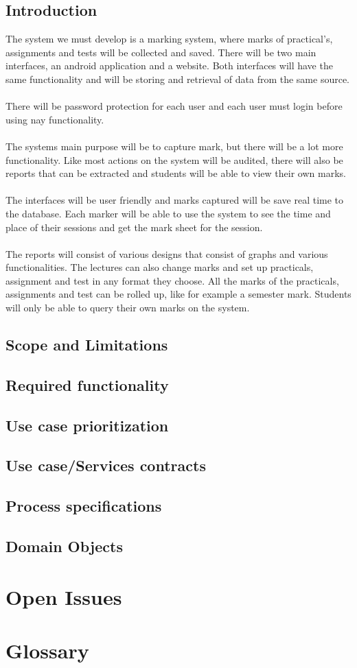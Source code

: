 \documentclass[10pt,a4paper]{article}
\begin{document}
\subsection{Introduction}
The system we must develop is a marking system, where marks of practical’s, assignments and tests will be collected and saved. There will be two main interfaces, an android application and a website. Both interfaces will have the same functionality and will be storing and retrieval of data from the same source.\\\\
There will be password protection for each user and each user must login before using nay functionality.\\\\
The systems main purpose will be to capture mark, but there will be a lot more functionality. Like most actions on the system will be audited, there will also be reports that can be extracted and students will be able to view their own marks.\\\\
The interfaces will be user friendly and marks captured will be save real time to the database. Each marker will be able to use the system to see the time and place of their sessions and get the mark sheet for the session.\\\\
The reports will consist of various designs that consist of graphs and various functionalities. The lectures can also change marks and set up practicals, assignment and test in any format they choose. All the marks of the practicals, assignments and test can be rolled up, like for example a semester mark. Students will only be able to query their own marks on the system. 

\subsection{Scope and Limitations}
\subsection{Required functionality}
\subsection{Use case prioritization}
\subsection{Use case/Services contracts}
\subsection{Process specifications}
\subsection{Domain Objects}

\section{Open Issues}
\section{Glossary}
\end{document}
